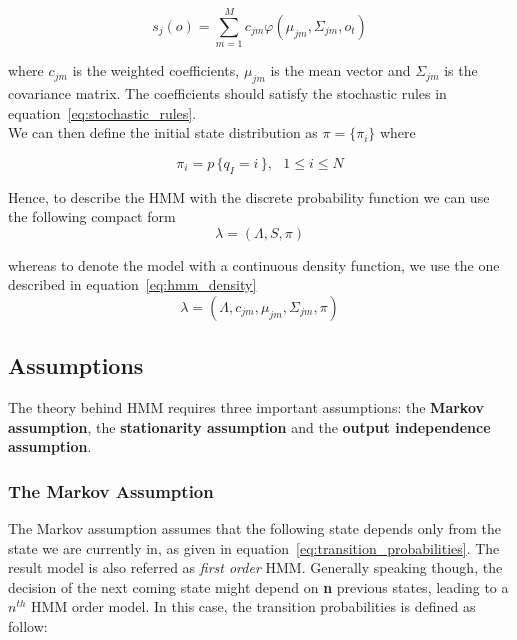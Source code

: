\begin{equation}
	s_{j}(o) = \sum_{m = 1}^{M} c_{jm}\varphi (\mu_{jm}, \Sigma_{jm}, o_{t})
\end{equation}

\noindent where $c_{jm}$ is the weighted coefficients, $\mu_{jm}$ is the mean vector and $\Sigma_{jm}$ is the covariance matrix. The coefficients should satisfy the stochastic rules in equation~\ref{eq:stochastic_rules}. \\
\noindent We can then define the initial state distribution as $\pi = \{\pi_{i}\}$ where

\begin{equation}
	\pi_{i} = p \, \{ q_{I} = i \, \}, \,\,\,\, 1 \leq i \leq N
\end{equation}

\noindent Hence, to describe the HMM with the discrete probability function we can use the following compact form
\begin{equation}
\label{eq:hmm_discrete}
	\lambda = (\Lambda, S, \pi )
\end{equation}

\noindent whereas to denote the model with a continuous density function, we use the one described in equation~\ref{eq:hmm_density}
\begin{equation}
\label{eq:hmm_density}
\lambda = (\Lambda, c_{jm}, \mu_{jm}, \Sigma_{jm}, \pi )
\end{equation}

\subsection{Assumptions}
\label{sub:assumptions_hmm}
The theory behind HMM requires three important assumptions: the \textbf{Markov assumption}, the \textbf{stationarity assumption} and the \textbf{output independence assumption}.

\subsubsection{The Markov Assumption}
The Markov assumption assumes that the following state depends only from the state we are currently in, as given in equation~\ref{eq:transition_probabilities}. The result model is also referred as \textit{first order} HMM. Generally speaking though, the decision of the next coming state might depend on \textbf{n} previous states, leading to a $n^{th}$ HMM order model. In this case, the transition probabilities is defined as follow:

